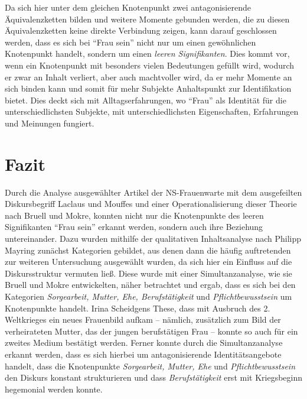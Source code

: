 \documentclass[12pt, titlepage=true, toc=bib]{scrartcl}
\begin{document}
{Da sich hier unter dem gleichen Knotenpunkt zwei antagonisierende Äquivalenzketten bilden und weitere Momente gebunden werden, die zu diesen Äquivalenzketten keine direkte Verbindung zeigen, kann darauf geschlossen werden, dass es sich bei "`Frau sein"' nicht nur um einen gewöhnlichen Knotenpunkt handelt, sondern um einen \textit{leeren Signifikanten}. Dies kommt vor, wenn ein Knotenpunkt mit besonders vielen Bedeutungen gefüllt wird, wodurch er zwar an Inhalt verliert, aber auch machtvoller wird, da er mehr Momente an sich binden kann und somit für mehr Subjekte Anhaltspunkt zur Identifikation bietet. Dies deckt sich mit Alltagserfahrungen, wo "`Frau"' als Identität für die unterschiedlichsten Subjekte, mit unterschiedlichsten Eigenschaften, Erfahrungen und Meinungen fungiert.


\section{Fazit}

Durch die Analyse ausgewählter Artikel der NS-Frauenwarte mit dem ausgefeilten Diskursbegriff Laclaus und Mouffes und einer Operationalisierung dieser Theorie nach Bruell und Mokre, konnten nicht nur die Knotenpunkte des leeren Signifikanten "`Frau sein"' erkannt werden, sondern auch ihre Beziehung untereinander. Dazu wurden mithilfe der qualitativen Inhaltsanalyse nach Philipp Mayring zunächst Kategorien gebildet, aus denen dann die häufig auftretenden zur weiteren Untersuchung ausgewählt wurden, da sich hier ein Einfluss auf die Diskursstruktur vermuten ließ. Diese wurde mit einer Simultanzanalyse, wie sie Bruell und Mokre entwickelten, näher betrachtet und ergab, dass es sich bei den Kategorien \textit{Sorgearbeit, Mutter, Ehe, Berufstätigkeit} und \textit{Pflichtbewusstsein} um Knotenpunkte handelt. Irina Scheidgens These, dass mit Ausbruch des 2. Weltkrieges ein neues Frauenbild aufkam -- nämlich, zusätzlich zum Bild der verheirateten Mutter, das der jungen berufstätigen Frau -- konnte so auch für ein zweites Medium bestätigt werden. Ferner konnte durch die Simultanzanalyse erkannt werden, dass es sich hierbei um antagonisierende Identitätsangebote handelt, dass die Knotenpunkte \textit{Sorgearbeit, Mutter, Ehe} und \textit{Pflichtbewusstsein} den Diskurs konstant strukturieren und dass \textit{Berufstätigkeit} erst mit Kriegsbeginn hegemonial werden konnte. 

}
\end{document}
